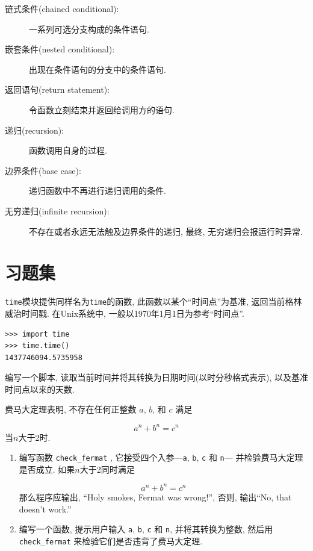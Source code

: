 \documentclass[10pt]{book}
\begin{document}
\begin{description}
\item[链式条件(chained conditional):] 一系列可选分支构成的条件语句. 

\item[嵌套条件(nested conditional):] 出现在条件语句的分支中的条件语句. 

\item[返回语句(return statement):] 令函数立刻结束并返回给调用方的语句. 

\item[递归(recursion):]  函数调用自身的过程. 

\item[边界条件(base case):]  递归函数中不再进行递归调用的条件. 

\item[无穷递归(infinite recursion):]  不存在或者永远无法触及边界条件的递归, 最终, 无穷递归会报运行时异常.

\end{description}

\section{习题集}

\begin{exercise}

{\tt time}模块提供同样名为{\tt time}的函数, 此函数以某个``时间点''为基准, 
返回当前格林威治时间戳. 在Unix系统中, 
一般以1970年1月1日为参考``时间点''. 

\begin{verbatim}
>>> import time
>>> time.time()
1437746094.5735958
\end{verbatim}

编写一个脚本, 读取当前时间并将其转换为日期时间(以时分秒格式表示), 
以及基准时间点以来的天数. 

\end{exercise}


\begin{exercise}

费马大定理表明, 不存在任何正整数
$a$, $b$, 和 $c$ 满足

\[ a^n + b^n = c^n \]
%
当$n$大于2时.

\begin{enumerate}

\item 编写函数 \verb"check_fermat" , 它接受四个入参---{\tt a}, {\tt b}, {\tt c} 和 {\tt n}---
并检验费马大定理是否成立. 
如果$n$大于2同时满足

\[a^n + b^n = c^n \]
%
那么程序应输出, ``Holy smokes, Fermat was wrong!'', 
否则, 输出``No, that doesn't work.''

\item 编写一个函数, 提示用户输入 {\tt a}, {\tt b}, {\tt c} 和 {\tt n}, 
并将其转换为整数, 然后用\verb"check_fermat" 来检验它们是否违背了费马大定理. 

\end{enumerate}

\end{exercise}
\end{document}
